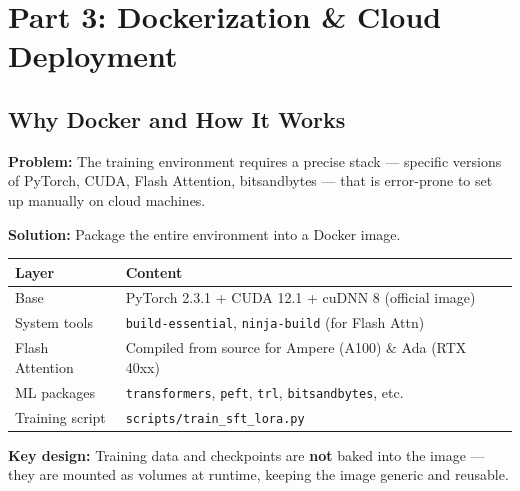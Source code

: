 \section{Part 3: Dockerization \& Cloud Deployment}

\subsection{Why Docker and How It Works}
\begin{frame}{\insertsubsection}
  \textbf{Problem:} The training environment requires a precise stack ---
  specific versions of PyTorch, CUDA, Flash Attention, bitsandbytes ---
  that is error-prone to set up manually on cloud machines.

  \vspace{0.15cm}
  \textbf{Solution:} Package the entire environment into a Docker image.

  \vspace{0.1cm}
  \small
  \begin{tabular}{p{} p{}}
    \textbf{Layer}    & \textbf{Content}                                              \\
    \hline
    Base              & PyTorch 2.3.1 + CUDA 12.1 + cuDNN 8 (official image)         \\
    System tools      & \texttt{build-essential}, \texttt{ninja-build} (for Flash Attn) \\
    Flash Attention   & Compiled from source for Ampere (A100) \& Ada (RTX 40xx)     \\
    ML packages       & \texttt{transformers}, \texttt{peft}, \texttt{trl}, \texttt{bitsandbytes}, etc. \\
    Training script   & \texttt{scripts/train\_sft\_lora.py}                          \\
  \end{tabular}

  \vspace{0.15cm}
  \normalsize
  \textbf{Key design:} Training data and checkpoints are \textbf{not} baked into
  the image --- they are mounted as volumes at runtime, keeping the image generic
  and reusable.
\end{frame}

